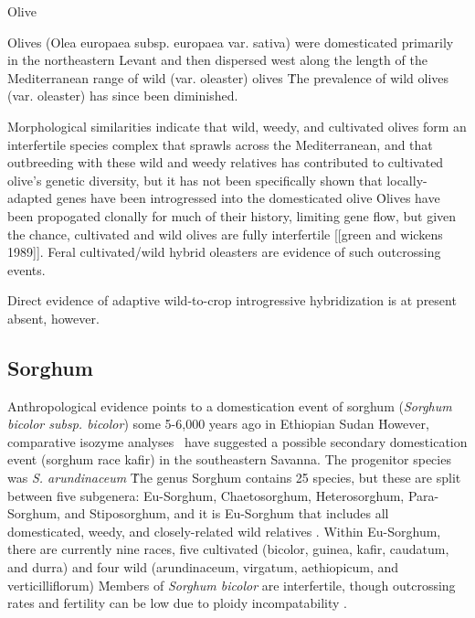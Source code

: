 \documentclass[11pt]{article}
\begin{document}
Olive

Olives (Olea europaea subsp. europaea var. sativa) were domesticated primarily in the northeastern Levant and then dispersed west along the length of the Mediterranean range of wild (var. oleaster) olives \cite{besnard2013complex}\.
The prevalence of wild olives (var. oleaster) has since been diminished.

Morphological similarities indicate that wild, weedy, and cultivated olives form an interfertile species complex that sprawls across the Mediterranean, and that outbreeding with these wild and weedy relatives has contributed to cultivated olive's genetic diversity, but it has not been specifically shown that locally-adapted genes have been introgressed into the domesticated olive \cite{zohary1975beginnings}\.

Olives have been propogated clonally for much of their history, limiting gene flow, but given the chance, cultivated and wild olives are fully interfertile [[green and wickens 1989]].
Feral cultivated/wild hybrid oleasters are evidence of such outcrossing events.

Direct evidence of adaptive wild-to-crop introgressive hybridization is at present absent, however.
















\subsection*{Sorghum}
Anthropological evidence points to a domestication event of sorghum (\emph{Sorghum bicolor subsp. bicolor}) some 5-6,000 years ago in Ethiopian Sudan \cite{smith2000sorghum}\.
However, comparative isozyme analyses \cite{shechter1975comparative}\ have suggested a possible secondary domestication event (sorghum race kafir) in the southeastern Savanna.
The progenitor species was \emph{S. arundinaceum} \cite{doggett1988sorghum, harlan1971toward}\.
The genus Sorghum contains 25 species, but these are split between five subgenera: Eu-Sorghum, Chaetosorghum, Heterosorghum, Para-Sorghum, and Stiposorghum, and it is Eu-Sorghum that includes all domesticated, weedy, and closely-related wild relatives \cite{USDAARS2007, garber1950cytotaxonomic}.
Within Eu-Sorghum, there are currently nine races, five cultivated (bicolor, guinea, kafir, caudatum, and durra) and four wild (arundinaceum, virgatum, aethiopicum, and verticilliflorum) \cite{smith2000sorghum}\.
Members of \emph{Sorghum bicolor} are interfertile, though outcrossing rates and fertility can be low due to ploidy incompatability \cite{doggett1988sorghum, arriola1996crop}.
\end{document}
